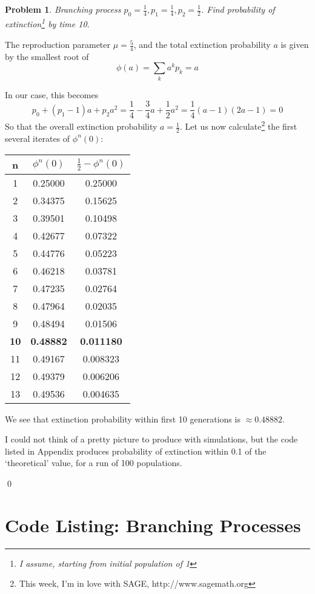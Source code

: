 \documentclass[8pt,notitlepage]{report}
\newtheorem{problem}{Problem}
\newenvironment{solution}[1][Solution]{\begin{trivlist}
    \item[\hskip \labelsep {\bfseries #1}]}{\end{trivlist}}
\newcommand{\PP}{\mathbb{P}}
\begin{document}
\begin{problem}
Branching process $p_0=\frac{1}{4}, p_1=\frac{1}{4}, p_2=\frac{1}{2}$. 
Find probability of extinction\footnote{
	I assume, starting from initial population of 1} by time 10.
\end{problem}
\begin{solution}


The reproduction parameter $\mu=\frac{5}{4}$, and 
the total extinction probability $a$ is given by the smallest root of
\begin{equation}
\phi(a) = \sum_k a^k p_k = a
\end{equation}

In our case, this becomes
\begin{equation}
p_0 + (p_1 - 1) a + p_2 a^2 
	= \frac{1}{4} - \frac{3}{4} a + \frac{1}{2} a^2
	= \frac{1}{4}(a-1)(2a-1)
	= 0
\end{equation}
So that the overall extinction probability $a=\frac{1}{2}$. 
Let us now calculate\footnote{
	This week, I'm in love with {\rm SAGE}, http://www.sagemath.org} 
the first several iterates of $\phi^n(0)$:

\begin{tabular}{ccc}
n & $\phi^n(0)$ & $\frac{1}{2} -\phi^n(0)$ \\
\hline
1 & 0.25000 & 0.25000 			\\
2 & 0.34375 & 0.15625			\\
3 & 0.39501 &0.10498		\\
4 & 0.42677 & 0.07322		\\
5 & 0.44776 & 0.05223		\\
6 & 0.46218 & 0.03781		\\
7 & 0.47235 & 0.02764		\\
8 & 0.47964 & 0.02035		\\
9 & 0.48494 & 0.01506		\\
{\bf 10}& {\bf 0.48882}&  {\bf 0.011180}	\\
11 & 0.49167 & 0.008323	\\
12 & 0.49379 & 0.006206	\\
13 & 0.49536 & 0.004635	\\
\end{tabular}

We see that extinction probability within first 10 generations is 
$\approx 0.48882$.

I could not think of a pretty picture to produce with simulations, 
but the code listed in Appendix produces probability of extinction 
within 0.1 of the `theoretical' value, for a run of 100 populations.




\qed
\end{solution}
\newpage
\appendix
\section*{Code Listing: Branching Processes}

\end{document}
